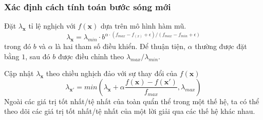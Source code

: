 \begin{frame}
    \frametitle{Xác định cách tính toán bước sóng mới}
    \begin{block}{Đặt $\lambda_{\mathbf{x}}$ tỉ lệ nghịch với $f(\mathbf{x})$ dựa trên mô hình hàm mũ.}
        \begin{equation}
            \label{eq:e5}
            \lambda_{\mathbf{x}} = \lambda_{min} \cdot b^{\alpha \cdot (f_{max} - f_(x) + \epsilon)/(f_{max} - f_{min} + \epsilon)}
        \end{equation}
        trong đó $b$ và $\alpha$ là hai tham số điều khiển. Để thuận tiện, $\alpha$ thường được đặt bằng $1$, sau đó $b$ được điều chỉnh theo $\lambda_{max} / \lambda_{min}$.
    \end{block}
    \begin{block}{Cập nhật $\lambda_{\mathbf{x}}$ theo chiều nghịch đảo với sự thay đổi của $f(\mathbf{x})$}
        \begin{equation}
            \label{eq:e7}
            \lambda_{\mathbf{x'}} = min(\lambda_{\mathbf{x}} + \alpha \frac{f(\mathbf{x}) - f(\mathbf{x'})}{f_{max}}, \lambda_{max})
        \end{equation}
        Ngoài các giá trị tốt nhất/tệ nhất của toàn quẩn thể trong một thế hệ, ta có thể theo dõi các giá trị tốt nhất/tệ nhất của một lời giải qua các thế hệ khác nhau.
    \end{block}
\end{frame}